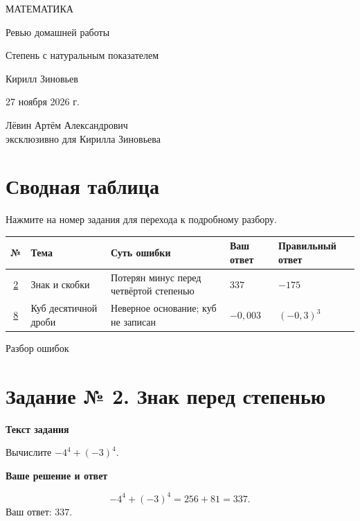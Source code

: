 \documentclass[a4paper,12pt]{article}
\newcommand{\parthead}[1]{\par\medskip\textbf{#1}\par}
\begin{document}
\hypersetup{pageanchor=false}
\begin{titlepage}
\centering
\vspace*{25mm}
{\Large\color{darkaccent} МАТЕМАТИКА\par}
\vspace{14mm}
{\huge Ревью домашней работы\par}
\vspace{9mm}
{\LARGE\color{accent} Степень с натуральным показателем\par}
\vfill
{\large Кирилл Зиновьев\par}
\vspace{8mm}
27 ноября 2026 г.\par
\vspace{14mm}
{\small Лёвин Артём Александрович\\эксклюзивно для Кирилла Зиновьева\par}
\vspace{17mm}
\end{titlepage}
\hypersetup{pageanchor=true}
\section*{\color{darkaccent} Сводная таблица}
Нажмите на номер задания для перехода к подробному разбору.

\medskip
{\renewcommand{\arraystretch}{1.5}
\begin{tabularx}{\linewidth}{@{}c >{\raggedright\arraybackslash}p{3cm} >{\raggedright\arraybackslash}X >{\raggedright\arraybackslash}p{2cm} >{\raggedright\arraybackslash}p{2.6cm}@{}}
\toprule
№ & Тема & Суть ошибки & Ваш ответ & Правильный ответ\\
\midrule
\hyperref[task:2]{2} & Знак и скобки & Потерян минус перед четвёртой степенью & $337$ & $-175$\\
\hyperref[task:8]{8} & Куб десятичной дроби & Неверное основание; куб не записан & $-0{,}003$ & $(-0{,}3)^3$\\
\bottomrule
\end{tabularx}}
\clearpage
\thispagestyle{empty}
\null\vfill
\begin{center}{\Huge\color{darkaccent} Разбор ошибок}\end{center}
\vfill\null
\clearpage
{}\label{task:2}
\section*{\color{darkaccent} Задание № 2. Знак перед степенью}
\parthead{Текст задания}
Вычислите $-4^4+(-3)^4$.
\parthead{Ваше решение и ответ}
\[-4^4+(-3)^4=256+81=337.\]
Ваш ответ: $337$.
\end{document}
